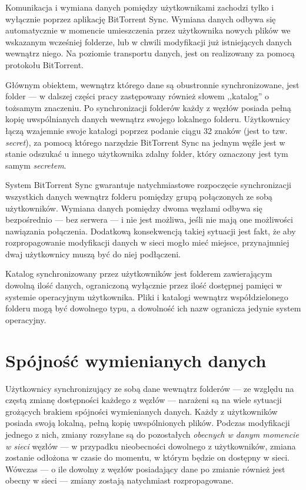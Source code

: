 \documentclass[polish,a4paper,twoside]{ppfcmthesis}
\begin{document}
Komunikacja i wymiana danych pomiędzy użytkownikami zachodzi tylko i wyłącznie poprzez aplikację BitTorrent Sync. Wymiana danych odbywa się automatycznie w momencie umieszczenia przez użytkownika nowych plików we wskazanym wcześniej folderze, lub w chwili modyfikacji już istniejących danych wewnątrz niego. Na poziomie transportu danych, jest on realizowany za pomocą protokołu BitTorrent.

Głównym obiektem, wewnątrz którego dane są obustronnie synchronizowane, jest folder --- w dalszej części pracy zastępowany również słowem ,,katalog'' o tożsamym znaczeniu. Po synchronizacji folderów każdy z węzłów posiada pełną kopię uwspólnianych danych wewnątrz swojego lokalnego folderu. Użytkownicy łączą wzajemnie swoje katalogi poprzez podanie ciągu 32 znaków (jest to tzw. \emph{secret}), za pomocą którego narzędzie BitTorrent Sync na jednym węźle jest w stanie odszukać u innego użytkownika zdalny folder, który oznaczony jest tym samym \emph{secretem}. 

System BitTorrent Sync gwarantuje natychmiastowe rozpoczęcie synchronizacji wszystkich danych wewnątrz folderu pomiędzy grupą połączonych ze sobą użytkowników. Wymiana danych pomiędzy dwoma węzłami odbywa się bezpośrednio --- bez serwera --- i nie jest możliwa, jeśli nie mają one możliwości nawiązania połączenia. Dodatkową konsekwencją takiej sytuacji jest fakt, że aby rozpropagowanie modyfikacji danych w sieci mogło mieć miejsce, przynajmniej dwaj użytkownicy muszą być do niej podłączeni.

Katalog synchronizowany przez użytkowników jest folderem zawierającym dowolną ilość danych, ograniczoną wyłącznie przez ilość dostępnej pamięci w systemie operacyjnym użytkownika. Pliki i katalogi wewnątrz współdzielonego folderu mogą być dowolnego typu, a dowolność ich nazw ogranicza jedynie system operacyjny.

\section*{Spójność wymienianych danych}

Użytkownicy synchronizujący ze sobą dane wewnątrz folderów --- ze względu na częstą zmianę dostępności każdego z węzłów --- narażeni są na wiele sytuacji grożących brakiem spójności wymienianych danych. Każdy z użytkowników posiada swoją lokalną, pełną kopię uwspólnionych plików. Podczas modyfikacji jednego z nich, zmiany rozsyłane są do pozostałych \emph{obecnych w danym momencie w sieci} węzłów --- w przypadku nieobecności dowolnego z użytkowników, zmiana zostanie odłożona w czasie do momentu, w którym będzie on dostępny w sieci. Wówczas --- o ile dowolny z węzłów posiadający dane po zmianie również jest obecny w sieci --- zmiany zostają natychmiast rozpropagowane.
\end{document}
